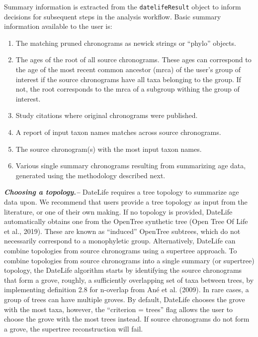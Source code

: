 \documentclass[
  english,
  man]{apa6}
\providecommand{\tightlist}{%
  \setlength{\itemsep}{0pt}\setlength{\parskip}{0pt}}
\begin{document}
Summary information is extracted from the \texttt{datelifeResult} object to inform decisions for subsequent steps in the analysis workflow. Basic summary information available to the user is:

\begin{enumerate}
\def\labelenumi{\arabic{enumi}.}
\tightlist
\item
  The matching pruned chronograms as newick strings or ``phylo'' objects.
\item
  The ages of the root of all source chronograms. These ages can correspond to the age of the most recent common ancestor (mrca) of the user's group of interest if the source chronograms have all taxa belonging to the group. If not, the root corresponds to the mrca of a subgroup withing the group of interest.
\item
  Study citations where original chronograms were published.
\item
  A report of input taxon names matches across source chronograms.
\item
  The source chronogram(s) with the most input taxon names.
\item
  Various single summary chronograms resulting from summarizing age data, generated using the methodology described next.
\end{enumerate}

\emph{\textbf{Choosing a topology.--}}
DateLife requires a tree topology to summarize age data upon.
We recommend that users provide a tree topology as input from the literature, or one of their own making. If no topology is provided, DateLife automatically obtains one from the OpenTree synthetic tree (Open Tree Of Life et al., 2019). These are known as ``induced'' OpenTree subtrees, which do not necessarily correspond to a monophyletic group.
Alternatively, DateLife can combine topologies from source chronograms using a supertree approach.
To combine topologies from source chronograms into a single summary (or supertree) topology, the DateLife algorithm starts by identifying the source chronograms that form a grove, roughly, a sufficiently overlapping set of taxa between trees, by implementing definition 2.8 for n-overlap from Ané et al. (2009). In rare cases, a group of trees can have multiple groves. By default, DateLife chooses the grove with the most taxa, however, the ``criterion = trees'' flag allows the user to choose the grove with the most trees instead.
If source chronograms do not form a grove, the supertree reconstruction will fail.
\end{document}
